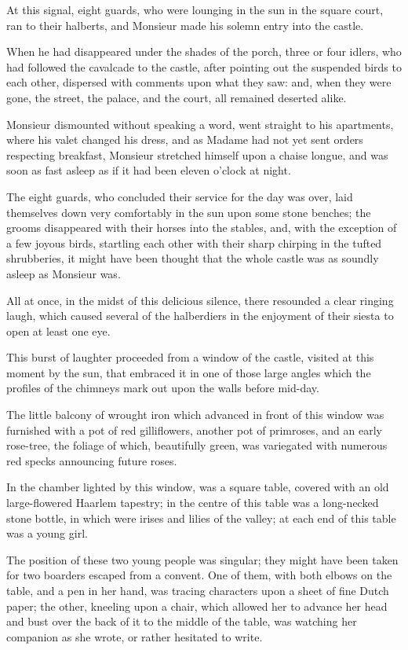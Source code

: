 At this signal, eight guards, who were lounging in the sun in the square court, ran to their halberts, and Monsieur made his solemn entry into the castle.

When he had disappeared under the shades of the porch, three or four idlers, who had followed the cavalcade to the castle, after pointing out the suspended birds to each other, dispersed with comments upon what they saw: and, when they were gone, the street, the palace, and the court, all remained deserted alike.

Monsieur dismounted without speaking a word, went straight to his apartments, where his valet changed his dress, and as Madame had not yet sent orders respecting breakfast, Monsieur stretched himself upon a chaise longue, and was soon as fast asleep as if it had been eleven o'clock at night.

The eight guards, who concluded their service for the day was over, laid themselves down very comfortably in the sun upon some stone benches; the grooms disappeared with their horses into the stables, and, with the exception of a few joyous birds, startling each other with their sharp chirping in the tufted shrubberies, it might have been thought that the whole castle was as soundly asleep as Monsieur was.

All at once, in the midst of this delicious silence, there resounded a clear ringing laugh, which caused several of the halberdiers in the enjoyment of their siesta to open at least one eye.

This burst of laughter proceeded from a window of the castle, visited at this moment by the sun, that embraced it in one of those large angles which the profiles of the chimneys mark out upon the walls before mid-day.

The little balcony of wrought iron which advanced in front of this window was furnished with a pot of red gilliflowers, another pot of primroses, and an early rose-tree, the foliage of which, beautifully green, was variegated with numerous red specks announcing future roses.

In the chamber lighted by this window, was a square table, covered with an old large-flowered Haarlem tapestry; in the centre of this table was a long-necked stone bottle, in which were irises and lilies of the valley; at each end of this table was a young girl.

The position of these two young people was singular; they might have been taken for two boarders escaped from a convent. One of them, with both elbows on the table, and a pen in her hand, was tracing characters upon a sheet of fine Dutch paper; the other, kneeling upon a chair, which allowed her to advance her head and bust over the back of it to the middle of the table, was watching her companion as she wrote, or rather hesitated to write.

